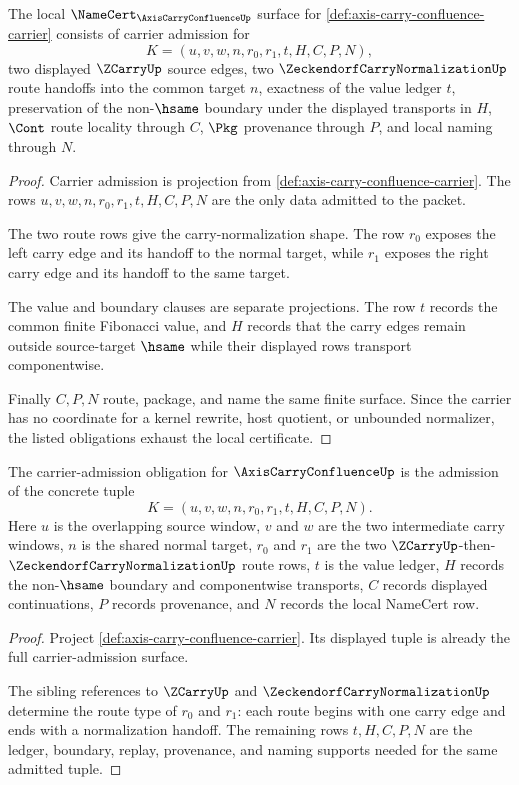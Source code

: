 \begin{theorem}
\label{thm:axis-carry-confluence-namecert-obligations}
The local $\NameCert_{\AxisCarryConfluenceUp}$ surface for \autoref{def:axis-carry-confluence-carrier} consists of carrier admission for
$$
K=(u,v,w,n,r_0,r_1,t,H,C,P,N),
$$
two displayed $\ZCarryUp$ source edges, two $\ZeckendorfCarryNormalizationUp$ route handoffs into the common target $n$, exactness of the value ledger $t$, preservation of the non-$\hsame$ boundary under the displayed transports in $H$, $\Cont$ route locality through $C$, $\Pkg$ provenance through $P$, and local naming through $N$.
\end{theorem}
\begin{proof}
Carrier admission is projection from \autoref{def:axis-carry-confluence-carrier}. The rows $u,v,w,n,r_0,r_1,t,H,C,P,N$ are the only data admitted to the packet.

The two route rows give the carry-normalization shape. The row $r_0$ exposes the left carry edge and its handoff to the normal target, while $r_1$ exposes the right carry edge and its handoff to the same target.

The value and boundary clauses are separate projections. The row $t$ records the common finite Fibonacci value, and $H$ records that the carry edges remain outside source-target $\hsame$ while their displayed rows transport componentwise.

Finally $C,P,N$ route, package, and name the same finite surface. Since the carrier has no coordinate for a kernel rewrite, host quotient, or unbounded normalizer, the listed obligations exhaust the local certificate.
\end{proof}

\begin{theorem}
\label{thm:axis-carry-confluence-carrier-obligation}
The carrier-admission obligation for $\AxisCarryConfluenceUp$ is the admission of the concrete tuple
$$
K=(u,v,w,n,r_0,r_1,t,H,C,P,N).
$$
Here $u$ is the overlapping source window, $v$ and $w$ are the two intermediate carry windows, $n$ is the shared normal target, $r_0$ and $r_1$ are the two $\ZCarryUp$-then-$\ZeckendorfCarryNormalizationUp$ route rows, $t$ is the value ledger, $H$ records the non-$\hsame$ boundary and componentwise transports, $C$ records displayed continuations, $P$ records provenance, and $N$ records the local NameCert row.
\end{theorem}
\begin{proof}
Project \autoref{def:axis-carry-confluence-carrier}. Its displayed tuple is already the full carrier-admission surface.

The sibling references to $\ZCarryUp$ and $\ZeckendorfCarryNormalizationUp$ determine the route type of $r_0$ and $r_1$: each route begins with one carry edge and ends with a normalization handoff. The remaining rows $t,H,C,P,N$ are the ledger, boundary, replay, provenance, and naming supports needed for the same admitted tuple.
\end{proof}

